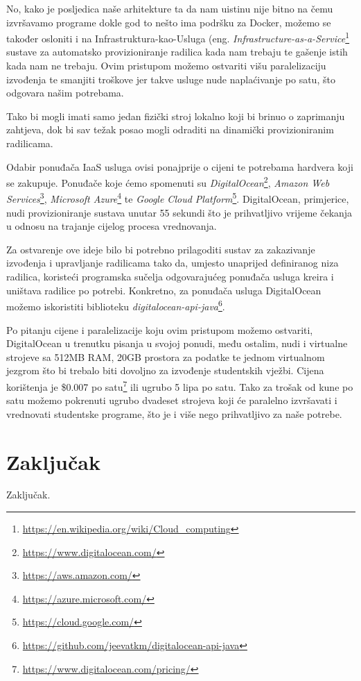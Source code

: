 \documentclass[times, utf8, zavrsni]{fer}
\begin{document}
{{		  No, kako je posljedica naše arhitekture ta da nam uistinu nije bitno na čemu izvršavamo programe dokle god to nešto ima podršku za Docker, možemo se također osloniti i na Infrastruktura-kao-Usluga (eng. {\textit{Infrastructure-as-a-Service}}{\footnote{{\url{https://en.wikipedia.org/wiki/Cloud_computing}}}} sustave za automatsko provizioniranje radilica kada nam trebaju te gašenje istih kada nam ne trebaju. Ovim pristupom možemo ostvariti višu paralelizaciju izvođenja te smanjiti troškove jer takve usluge nude naplaćivanje po satu, što odgovara našim potrebama.

Tako bi mogli imati samo jedan fizički stroj lokalno koji bi brinuo o zaprimanju zahtjeva, dok bi sav težak posao mogli odraditi na dinamički provizioniranim radilicama.

Odabir ponuđača IaaS usluga ovisi ponajprije o cijeni te potrebama hardvera koji se zakupuje. Ponuđače koje ćemo spomenuti su {\textit{DigitalOcean}}{\footnote{\url{https://www.digitalocean.com/}}}, {\textit{Amazon Web Services}}{\footnote{\url{https://aws.amazon.com/}}}, {\textit{Microsoft Azure}}{\footnote{\url{https://azure.microsoft.com/}}} te {\textit{Google Cloud Platform}}{\footnote{\url{https://cloud.google.com/}}}. DigitalOcean, primjerice, nudi provizioniranje sustava unutar 55 sekundi što je prihvatljivo vrijeme čekanja u odnosu na trajanje cijelog procesa vrednovanja.

Za ostvarenje ove ideje bilo bi potrebno prilagoditi sustav za zakazivanje izvođenja i upravljanje radilicama tako da, umjesto unaprijed definiranog niza radilica, koristeći programska sučelja odgovarajućeg ponuđača usluga kreira i uništava radilice po potrebi. Konkretno, za ponuđača usluga DigitalOcean možemo iskoristiti biblioteku {\textit{digitalocean-api-java}}{\footnote{\url{https://github.com/jeevatkm/digitalocean-api-java}}}.

Po pitanju cijene i paralelizacije koju ovim pristupom možemo ostvariti, DigitalOcean u trenutku pisanja u svojoj ponudi, među ostalim, nudi i virtualne strojeve sa 512MB RAM, 20GB prostora za podatke te jednom virtualnom jezgrom što bi trebalo biti dovoljno za izvođenje studentskih vježbi. Cijena korištenja je \$0.007 po satu{\footnote{\url{https://www.digitalocean.com/pricing/}}} ili ugrubo 5 lipa po satu. Tako za trošak od kune po satu možemo pokrenuti ugrubo dvadeset strojeva koji će paralelno izvršavati i vrednovati studentske programe, što je i više nego prihvatljivo za naše potrebe.


\chapter{Zaključak}
Zaključak.

}}
\end{document}
